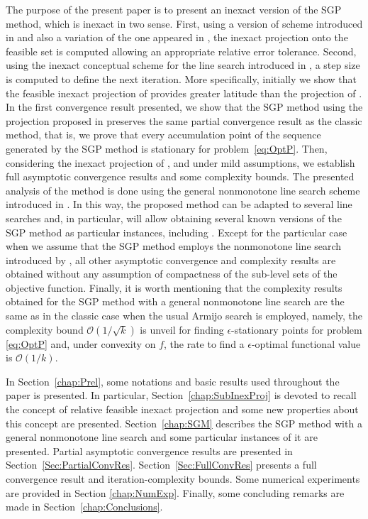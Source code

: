 The purpose of the present  paper is to present an inexact version of the SGP method, which  is inexact in two sense. First,  using  a version of  scheme introduced in \cite{BirginMartinezRaydan2003} and also a variation of the one appeared in \cite[Example 1]{VillaSalzo2013},  the inexact projection  onto the feasible  set is computed  allowing an appropriate  relative error tolerance. Second,  using the inexact  conceptual scheme for the  line search  introduced  in  \cite{GrapigliaSachs2020, SachsSachs2011}, a step size is computed  to define the next iteration.   More specifically, initially we show that the  feasible inexact  projection of \cite{BirginMartinezRaydan2003} provides greater latitude than the projection of \cite[Example 1]{VillaSalzo2013}.  In the first  convergence result presented, we show that the SGP method using the projection proposed in \cite{BirginMartinezRaydan2003} preserves the same partial convergence result as the classic method, that is, we prove that every accumulation point  of the sequence generated by the SGP method is stationary for problem~\eqref{eq:OptP}. Then, considering the inexact projection of \cite[Example 1]{VillaSalzo2013}, and  under mild  assumptions,  we establish  full asymptotic convergence results  and  some complexity bounds. The  presented analysis of the method is done using the general  nonmonotone line search scheme  introduced in \cite{GrapigliaSachs2020}. In this way, the proposed method can be adapted to several line searches and, in particular, will allow obtaining several known versions of the SGP method as particular instances,  including  \cite{yunier_roman2010,BirginMartinezRaydan2003,Iusem2003,Xihong2018}. Except for the particular case when we assume that the SGP method employs  the nonmonotone line search introduced by \cite{Grippo1986}, all other  asymptotic convergence and complexity  results are obtained without any assumption of compactness of the sub-level sets of the objective function.  Finally, it is worth mentioning that the complexity results obtained  for the SGP method with a general nonmonotone line search  are the same as in the classic case when the usual Armijo search is employed, namely,  the complexity bound  $\mathcal{O}(1/\sqrt{k})$ is unveil for finding $\epsilon$-stationary points for problem \eqref{eq:OptP} and, under convexity on $f$, the rate to find a $\epsilon$-optimal functional value is $\mathcal{O}(1/k)$.

In Section~\ref{chap:Prel}, some notations and basic results used throughout the paper is presented. In particular, Section~\ref{chap:SubInexProj} is devoted to recall the concept of relative feasible inexact projection and some  new properties about this concept are presented. Section~\ref{chap:SGM}  describes the SGP method with a general nonmonotone line search and some particular instances of it are presented.  Partial asymptotic convergence results  are presented in Section~\ref{Sec:PartialConvRes}. Section~\ref{Sec:FullConvRes}   presents  a full   convergence result  and iteration-complexity bounds. Some numerical experiments are provided in Section \ref{chap:NumExp}. Finally, some concluding remarks are made in Section~\ref{chap:Conclusions}.
